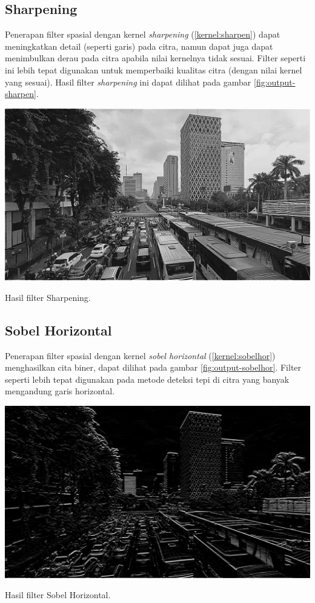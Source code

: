 \subsection{Sharpening}
Penerapan filter spasial dengan kernel \textit{sharpening} (\ref{kernel:sharpen}) dapat meningkatkan detail (seperti garis) pada citra, namun dapat juga dapat menimbulkan derau pada citra apabila nilai kernelnya tidak sesuai. Filter seperti ini lebih tepat digunakan untuk memperbaiki kualitas citra (dengan nilai kernel yang sesuai). Hasil filter \textit{sharpening} ini dapat dilihat pada gambar \ref{fig:output-sharpen}.
\begin{afigure}
    \includegraphics[width=0.8\linewidth, center]{images/output-image/input1-sharpen.png}
    \caption{Hasil filter Sharpening.}
    \label{fig:output-sharpen}
\end{afigure}

\subsection{Sobel Horizontal}
Penerapan filter spasial dengan kernel \textit{sobel horizontal} (\ref{kernel:sobelhor}) menghasilkan cita biner, dapat dilihat pada gambar \ref{fig:output-sobelhor}. Filter seperti lebih tepat digunakan pada metode deteksi tepi di citra yang banyak mengandung garis horizontal.
\begin{afigure}
    \includegraphics[width=0.8\linewidth, center]{images/output-image/input1-sobelhor.png}
    \caption{Hasil filter Sobel Horizontal.}
    \label{fig:output-sobelhor}
\end{afigure}


